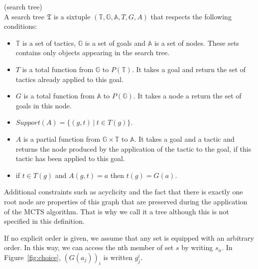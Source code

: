 \documentclass[runningheads,a4paper,draft]{svjour3}
\begin{document}
\begin{definition}(search tree)\\
A search tree $\mathfrak{T}$ is a sixtuple 
$(\mathbb{T},\mathbb{G},\mathbb{A},T,G,A)$ 
that respects the following conditions:
\begin{itemize}
\item $\mathbb{T}$ is a set of tactics, $\mathbb{G}$ is a set of goals 
 and $\mathbb{A}$ is a set of nodes. These sets contains only objects 
 appearing in the search tree.
\item $T$ is a total function from $\mathbb{G}$ to $P(\mathbb{T})$. It takes a 
goal and return the set of tactics already applied to this goal.
\item $G$ is a total function from $\mathbb{A}$ to $P(\mathbb{G})$. It takes a 
node a return the set of goals in this node.
\item $Support(A) = \lbrace (g,t)\ |\ t \in T(g) \rbrace$.
\item $A$ is a partial function from $\mathbb{G} \times \mathbb{T}$ to 
$\mathbb{A}$. It takes a goal and a tactic and returns the node produced by the 
application of the tactic to the goal, if this tactic has been applied to this 
goal.
\item if $t \in T(g)$ and $A(g,t) = a$ then $t(g) = G(a)$.
\end{itemize}

Additional constraints such as acyclicity and the fact that there is exactly 
one root node are properties of this graph that are preserved during the 
application of the MCTS algorithm. That is why we call it a tree although this 
is not specified in this definition.
\end{definition}

If no explicit order is given, we assume that any set is equipped with an 
arbitrary order. In this way, we can access the nth member of set $s$ by 
writing $s_n$. In Figure~\ref{fig:choice}, $(G(a_j))_i$ is written $g_j^i$.
\end{document}
